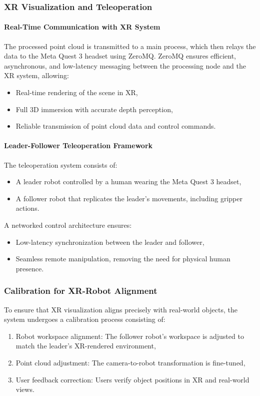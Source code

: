 \subsubsection{XR Visualization and Teleoperation}

\paragraph{Real-Time Communication with XR System}
The processed point cloud is transmitted to a main process, which then relays the data to the Meta Quest 3 headset using ZeroMQ. ZeroMQ ensures efficient, asynchronous, and low-latency messaging between the processing node and the XR system, allowing:  
\begin{itemize}  
    \item Real-time rendering of the scene in XR,  
    \item Full 3D immersion with accurate depth perception,  
    \item Reliable transmission of point cloud data and control commands.  
\end{itemize}  

\paragraph{Leader-Follower Teleoperation Framework}
The teleoperation system consists of:
\begin{itemize}
    \item A leader robot controlled by a human wearing the Meta Quest 3 headset,
    \item A follower robot that replicates the leader’s movements, including gripper actions.
\end{itemize}

A networked control architecture ensures:
\begin{itemize}
    \item Low-latency synchronization between the leader and follower,
    \item Seamless remote manipulation, removing the need for physical human presence.
\end{itemize}

\subsubsection{Calibration for XR-Robot Alignment}
To ensure that XR visualization aligns precisely with real-world objects, the system undergoes a calibration process consisting of:
\begin{enumerate}
    \item Robot workspace alignment: The follower robot’s workspace is adjusted to match the leader’s XR-rendered environment,
    \item Point cloud adjustment: The camera-to-robot transformation is fine-tuned,
    \item User feedback correction: Users verify object positions in XR and real-world views.
\end{enumerate}

